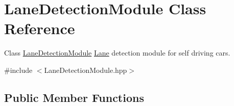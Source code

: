 \hypertarget{classLaneDetectionModule}{}\section{Lane\+Detection\+Module Class Reference}
\label{classLaneDetectionModule}


Class \hyperlink{classLaneDetectionModule}{Lane\+Detection\+Module} \hyperlink{classLane}{Lane} detection module for self driving cars.  




{\ttfamily \#include $<$Lane\+Detection\+Module.\+hpp$>$}

\subsection*{Public Member Functions}
